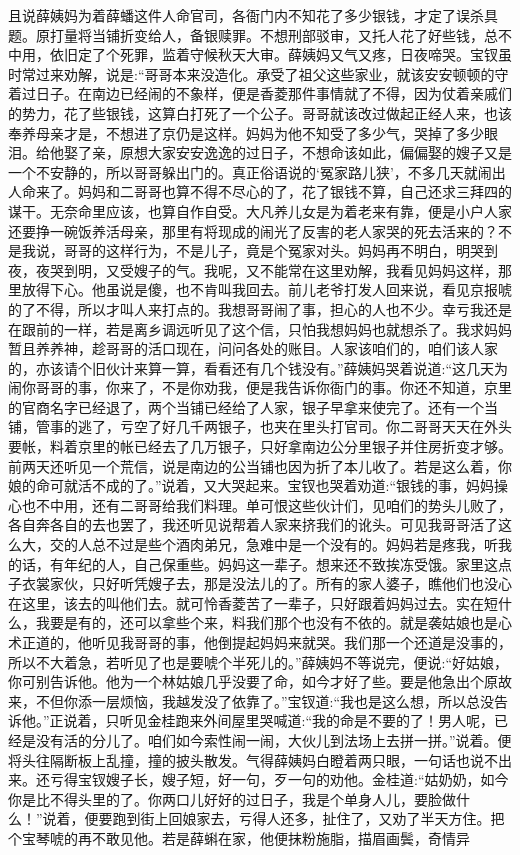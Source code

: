 \begin{parag}
    且说薛姨妈为着薛蟠这件人命官司，各衙门内不知花了多少银钱，才定了误杀具题。原打量将当铺折变给人，备银赎罪。不想刑部驳审，又托人花了好些钱，总不中用，依旧定了个死罪，监着守候秋天大审。薛姨妈又气又疼，日夜啼哭。宝钗虽时常过来劝解，说是:“哥哥本来没造化。承受了祖父这些家业，就该安安顿顿的守着过日子。在南边已经闹的不象样，便是香菱那件事情就了不得，因为仗着亲戚们的势力，花了些银钱，这算白打死了一个公子。哥哥就该改过做起正经人来，也该奉养母亲才是，不想进了京仍是这样。妈妈为他不知受了多少气，哭掉了多少眼泪。给他娶了亲，原想大家安安逸逸的过日子，不想命该如此，偏偏娶的嫂子又是一个不安静的，所以哥哥躲出门的。真正俗语说的‘冤家路儿狭’，不多几天就闹出人命来了。妈妈和二哥哥也算不得不尽心的了，花了银钱不算，自己还求三拜四的谋干。无奈命里应该，也算自作自受。大凡养儿女是为着老来有靠，便是小户人家还要挣一碗饭养活母亲，那里有将现成的闹光了反害的老人家哭的死去活来的？不是我说，哥哥的这样行为，不是儿子，竟是个冤家对头。妈妈再不明白，明哭到夜，夜哭到明，又受嫂子的气。我呢，又不能常在这里劝解，我看见妈妈这样，那里放得下心。他虽说是傻，也不肯叫我回去。前儿老爷打发人回来说，看见京报唬的了不得，所以才叫人来打点的。我想哥哥闹了事，担心的人也不少。幸亏我还是在跟前的一样，若是离乡调远听见了这个信，只怕我想妈妈也就想杀了。我求妈妈暂且养养神，趁哥哥的活口现在，问问各处的账目。人家该咱们的，咱们该人家的，亦该请个旧伙计来算一算，看看还有几个钱没有。”薛姨妈哭着说道:“这几天为闹你哥哥的事，你来了，不是你劝我，便是我告诉你衙门的事。你还不知道，京里的官商名字已经退了，两个当铺已经给了人家，银子早拿来使完了。还有一个当铺，管事的逃了，亏空了好几千两银子，也夹在里头打官司。你二哥哥天天在外头要帐，料着京里的帐已经去了几万银子，只好拿南边公分里银子并住房折变才够。前两天还听见一个荒信，说是南边的公当铺也因为折了本儿收了。若是这么着，你娘的命可就活不成的了。”说着，又大哭起来。宝钗也哭着劝道:“银钱的事，妈妈操心也不中用，还有二哥哥给我们料理。单可恨这些伙计们，见咱们的势头儿败了，各自奔各自的去也罢了，我还听见说帮着人家来挤我们的讹头。可见我哥哥活了这么大，交的人总不过是些个酒肉弟兄，急难中是一个没有的。妈妈若是疼我，听我的话，有年纪的人，自己保重些。妈妈这一辈子。想来还不致挨冻受饿。家里这点子衣裳家伙，只好听凭嫂子去，那是没法儿的了。所有的家人婆子，瞧他们也没心在这里，该去的叫他们去。就可怜香菱苦了一辈子，只好跟着妈妈过去。实在短什么，我要是有的，还可以拿些个来，料我们那个也没有不依的。就是袭姑娘也是心术正道的，他听见我哥哥的事，他倒提起妈妈来就哭。我们那一个还道是没事的，所以不大着急，若听见了也是要唬个半死儿的。”薛姨妈不等说完，便说:“好姑娘，你可别告诉他。他为一个林姑娘几乎没要了命，如今才好了些。要是他急出个原故来，不但你添一层烦恼，我越发没了依靠了。”宝钗道:“我也是这么想，所以总没告诉他。”正说着，只听见金桂跑来外间屋里哭喊道:“我的命是不要的了！男人呢，已经是没有活的分儿了。咱们如今索性闹一闹，大伙儿到法场上去拼一拼。”说着。便将头往隔断板上乱撞，撞的披头散发。气得薛姨妈白瞪着两只眼，一句话也说不出来。还亏得宝钗嫂子长，嫂子短，好一句，歹一句的劝他。金桂道:“姑奶奶，如今你是比不得头里的了。你两口儿好好的过日子，我是个单身人儿，要脸做什么！”说着，便要跑到街上回娘家去，亏得人还多，扯住了，又劝了半天方住。把个宝琴唬的再不敢见他。若是薛蝌在家，他便抹粉施脂，描眉画鬓，奇情异
\end{parag}

